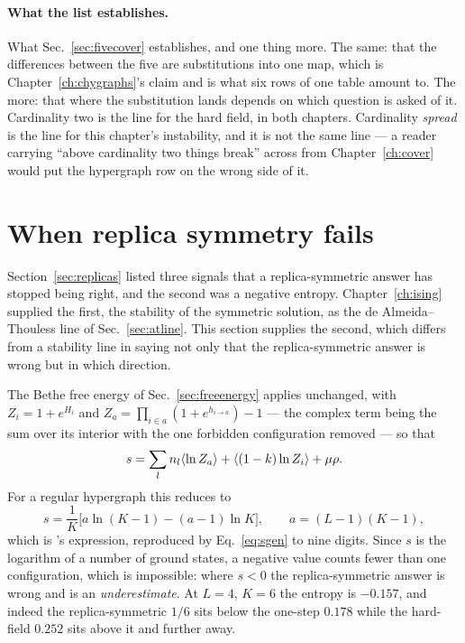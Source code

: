 \paragraph{What the list establishes.} What Sec.~\ref{sec:fivecover} establishes,
and one thing more. The same: that the differences between the five are
substitutions into one map, which is Chapter~\ref{ch:chygraphs}'s claim and is
what six rows of one table amount to. The more: that where the substitution
lands depends on which question is asked of it. Cardinality two is the line for
the hard field, in both chapters. Cardinality \emph{spread} is the line for this
chapter's instability, and it is not the same line --- a reader carrying
``above cardinality two things break'' across from Chapter~\ref{ch:cover} would
put the hypergraph row on the wrong side of it.

\section{When replica symmetry fails}
\label{sec:hsrsb}

Section~\ref{sec:replicas} listed three signals that a replica-symmetric answer
has stopped being right, and the second was a negative entropy.
Chapter~\ref{ch:ising} supplied the first, the stability of the symmetric
solution, as the de Almeida--Thouless line of Sec.~\ref{sec:atline}. This
section supplies the second, which differs from a stability line in saying not
only that the replica-symmetric answer is wrong but in which direction.

The Bethe free energy of Sec.~\ref{sec:freeenergy} applies unchanged, with
$Z_{i}=1+e^{H_{i}}$ and $Z_{a}=\prod_{i\in a}(1+e^{h_{i\to a}})-1$ --- the
complex term being the sum over its interior with the one forbidden
configuration removed --- so that
\begin{equation}
  s=\sum_{l}n_{l}\langle \ln Z_{a} \rangle+\langle (1-k)\ln Z_{i} \rangle+\mu\rho.
  \label{eq:sgen}
\end{equation}
For a regular hypergraph this reduces to
\begin{equation}
  s=\frac{1}{K}\bigl[a\ln(K-1)-(a-1)\ln K\bigr],
  \qquad
  a=(L-1)(K-1),
  \label{eq:entropy}
\end{equation}
which is \citeauthor{mezard2007}'s expression, reproduced by
Eq.~\eqref{eq:sgen} to nine digits. Since $s$ is the logarithm of a number of
ground states, a negative value counts fewer than one configuration, which is
impossible: where $s<0$ the replica-symmetric answer is wrong and is an
\emph{underestimate}. At $L=4$, $K=6$ the entropy is $-0.157$, and indeed the
replica-symmetric $1/6$ sits below the one-step $0.178$ while the hard-field
$0.252$ sits above it and further away.

